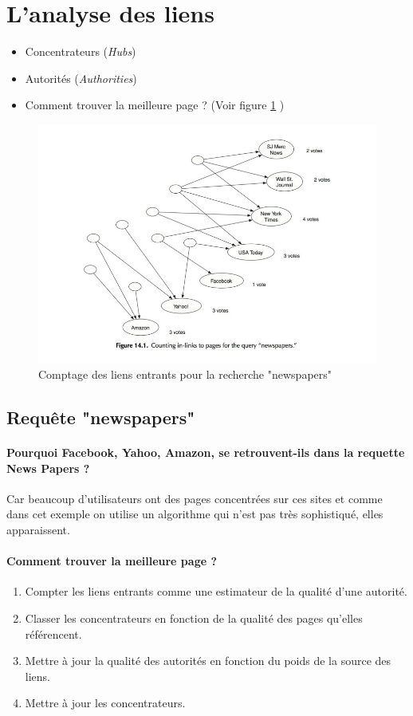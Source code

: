 \section{L'analyse des liens}
\begin{itemize}
\item Concentrateurs (\textit{Hubs})
\item Autorités (\textit{Authorities})
\item Comment trouver la meilleure page ? (Voir figure \ref{fig-14-1}	)
\end{itemize}



\begin{figure}[!h]
\centering
\includegraphics[scale=0.5]{images/ref/fig-14-1.jpeg}
\caption{Comptage des liens entrants pour la recherche "newspapers"}
\label{fig-14-1}
\end{figure}

\subsection*{Requête "newspapers"}

\paragraph{Pourquoi Facebook, Yahoo, Amazon, se retrouvent-ils dans la requette News Papers ?}
Car beaucoup d'utilisateurs ont des pages concentrées sur ces sites et comme dans cet exemple on utilise un algorithme qui n'est pas très sophistiqué, elles apparaissent. 

\paragraph{Comment trouver la meilleure page ?}
\begin{enumerate}
\item Compter les liens entrants comme une estimateur de la qualité d'une autorité.
\item Classer les concentrateurs en fonction de la qualité des pages qu'elles référencent.
\item Mettre à jour la qualité des autorités en fonction du poids de la source des liens.
\item Mettre à jour les concentrateurs.
\end{enumerate}

